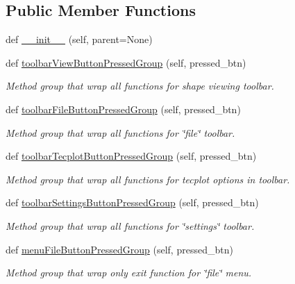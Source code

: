 \subsection*{Public Member Functions}
\begin{DoxyCompactItemize}
\item 
def \hyperlink{class_core_1_1_blade_py_core_a10b91a0caafffe00be0f4fa9c7a022dc}{\+\_\+\+\_\+init\+\_\+\+\_\+} (self, parent=None)
\item 
def \hyperlink{class_core_1_1_blade_py_core_ade955a1fc8334b12726d9f462ed25c62}{toolbar\+View\+Button\+Pressed\+Group} (self, pressed\+\_\+btn)
\begin{DoxyCompactList}\small\item\em Method group that wrap all functions for shape viewing toolbar. \end{DoxyCompactList}\item 
def \hyperlink{class_core_1_1_blade_py_core_ab5cf733dc40f2b17761056148fd51263}{toolbar\+File\+Button\+Pressed\+Group} (self, pressed\+\_\+btn)
\begin{DoxyCompactList}\small\item\em Method group that wrap all functions for \char`\"{}file\char`\"{} toolbar. \end{DoxyCompactList}\item 
def \hyperlink{class_core_1_1_blade_py_core_aabfc46144de45158b8d9c8952cfa1a7d}{toolbar\+Tecplot\+Button\+Pressed\+Group} (self, pressed\+\_\+btn)
\begin{DoxyCompactList}\small\item\em Method group that wrap all functions for tecplot options in toolbar. \end{DoxyCompactList}\item 
def \hyperlink{class_core_1_1_blade_py_core_abe6ec5c591c19b280f2e24bb198a1d6b}{toolbar\+Settings\+Button\+Pressed\+Group} (self, pressed\+\_\+btn)
\begin{DoxyCompactList}\small\item\em Method group that wrap all functions for \char`\"{}settings\char`\"{} toolbar. \end{DoxyCompactList}\item 
def \hyperlink{class_core_1_1_blade_py_core_aedcbcf23c32b9661d48f28e11c0c7172}{menu\+File\+Button\+Pressed\+Group} (self, pressed\+\_\+btn)
\begin{DoxyCompactList}\small\item\em Method group that wrap only exit function for \char`\"{}file\char`\"{} menu. \end{DoxyCompactList}\item 

\end{DoxyCompactItemize}
